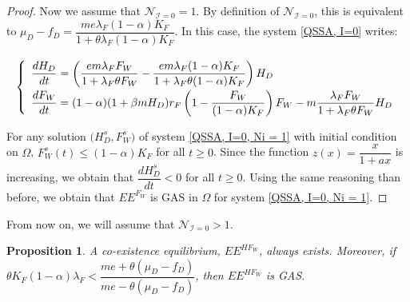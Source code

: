 \documentclass{article}
\newcommand{\lfw}{\lambda_{F}}
\newcommand{\lfw}{\lambda_{F}}
\newcommand{\cI}{\mathcal{I}}
\newtheorem{prop}{Proposition}
\begin{document}
\begin{proof}
Now we assume that $\mathcal{N}_{\cI = 0} = 1$. By definition of $\mathcal{N}_{\cI = 0}$, this is equivalent to $\mu_D - f_D = \dfrac{me \lfw (1-\alpha) K_F}{1 + \theta \lfw (1-\alpha)K_F}$. In this case, the system \eqref{QSSA, I=0} writes:

\begin{equation}
\def\arraystretch{2}
\left\lbrace \begin{array}{l}
\dfrac{dH_D}{dt} = \left(\dfrac{e m \lfw F_W}{1 + \lfw \theta F_W}- \dfrac{e m \lfw (1-\alpha) K_F}{1 + \lfw \theta (1-\alpha) K_F} \right) H_D \\
\dfrac{dF_W}{dt} = (1-\alpha) (1+\beta m H_D) r_F \left(1 - \dfrac{F_W}{(1-\alpha)K_F} \right) F_W - m \dfrac{\lfw F_W}{1 + \lfw \theta F_W} H_D \\
\end{array} \right.
\label{QSSA, I=0, Ni = 1}
\end{equation}

For any solution $\Big(H_D^s, F_W^s\Big)$ of system \eqref{QSSA, I=0, Ni = 1} with initial condition on $\Omega$, $F_W^{s}(t) \leq (1-\alpha) K_F$ for all $t\geq 0$. Since the function $z(x) = \dfrac{x}{1 + a x}$ is increasing, we obtain that $\dfrac{dH_D^s}{dt} < 0$ for all $t \geq 0$. 
Using the same reasoning than before, we obtain that $EE^{F_W}$ is GAS in $\Omega$ for system \eqref{QSSA, I=0, Ni = 1}.
\end{proof}

From now on, we will assume that $\mathcal{N}_{\cI = 0} > 1$.
\begin{prop}
A co-existence equilibrium, $EE^{HF_W}$, always exists. Moreover, if $\theta K_{F}(1-\alpha)\lambda_{F}<\dfrac{me+\theta(\mu_{D}-f_{D})}{me-\theta(\mu_{D}-f_{D})}$, then $EE^{HF_W}$ is GAS.
\end{prop}
\end{document}
